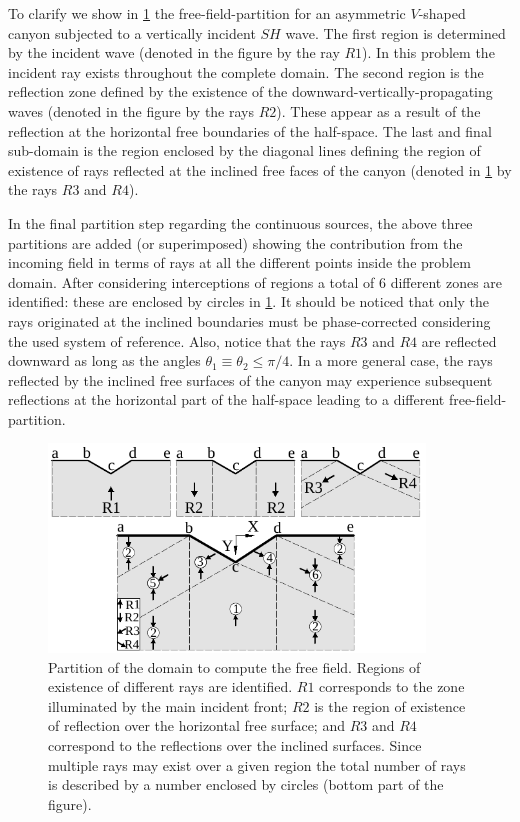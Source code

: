 \documentclass[11pt,letterpaper]{article}
\begin{document}
To clarify we show in \cref{fig:zones} the free-field-partition for an asymmetric $V$-shaped canyon subjected to a vertically incident $SH$ wave. The first region is determined by the incident wave (denoted in the figure by the ray $R1$). In this problem the incident ray exists throughout the complete domain. The second region is the reflection zone defined by the existence of the downward-vertically-propagating waves (denoted in the figure by the rays $R2$). These appear as a result of the reflection at the horizontal free boundaries of the half-space. The last and final sub-domain is the region enclosed by the diagonal lines defining the region of existence of rays reflected at the inclined free faces of the canyon (denoted in \cref{fig:zones} by the rays $R3$ and $R4$).

In the final partition step regarding the continuous sources, the above three partitions are added (or superimposed) showing the contribution from the incoming field in terms of rays at all the different points inside the problem domain. After considering interceptions of regions a total of 6 different zones are identified: these are enclosed by circles in \cref{fig:zones}. It should be noticed that only the rays originated at the inclined boundaries must be phase-corrected considering the used system of reference. Also, notice that the rays $R3$ and $R4$ are reflected downward as long as the angles $\theta_1 \equiv \theta_2 \leq \pi/4$. In a more general case, the rays reflected by the inclined free surfaces of the canyon may experience subsequent reflections at the horizontal part of the half-space leading to a different free-field-partition.

\begin{figure}[H]
\centering
\includegraphics[width=10cm]{IMAGES/00_Propuesta_1.pdf}
\caption{Partition of the domain to compute the free field. Regions of existence of different rays are identified. $R1$ corresponds to the zone illuminated by the main incident front; $R2$ is the region of existence of reflection over the horizontal free surface; and $R3$ and $R4$ correspond to the reflections over the inclined surfaces. Since multiple rays may exist over a given region the total number of rays is described by a number enclosed by circles (bottom part of the figure).}
\label{fig:zones}
\end{figure}
\end{document}
